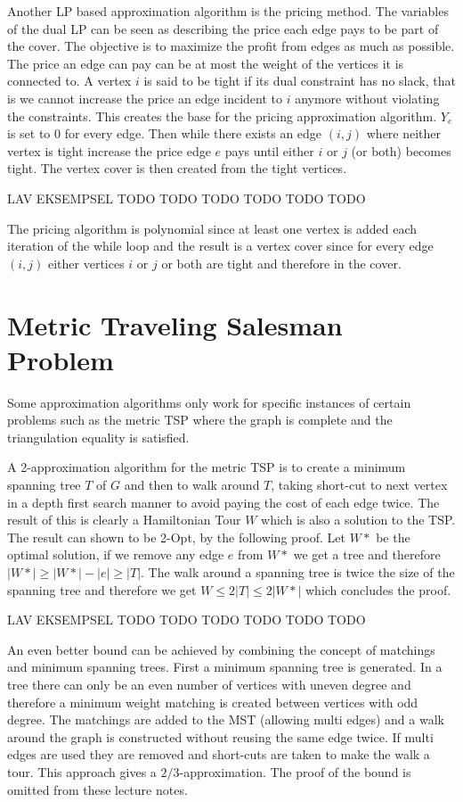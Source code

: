 Another LP based approximation algorithm is the pricing method. The variables of the dual LP can be seen as describing the price each edge pays to be part of the cover. The objective is to maximize the profit from edges as much as possible. The price an edge can pay can be at most the weight of the vertices it is connected to. A vertex $i$ is said to be tight if its dual constraint has no slack, that is we cannot increase the price an edge incident to $i$ anymore without violating the constraints. This creates the base for the pricing approximation algorithm. $Y_e$ is set to 0 for every edge. Then while there exists an edge $(i,j)$ where neither vertex is tight increase the price edge $e$ pays until either $i$ or $j$ (or both) becomes tight. The vertex cover is then created from the tight vertices.

LAV EKSEMPSEL TODO TODO TODO TODO TODO TODO

The pricing algorithm is polynomial since at least one vertex is added each iteration of the while loop and the result is a vertex cover since for every edge $(i,j)$ either vertices $i$ or $j$ or both are tight and therefore in the cover. 

\section{Metric Traveling Salesman Problem}
Some approximation algorithms only work for specific instances of certain problems such as the metric TSP where the graph is complete and the triangulation equality is satisfied. 

A 2-approximation algorithm for the metric TSP is to create a minimum spanning tree $T$ of $G$ and then to walk around $T$, taking short-cut to next vertex in a depth first search manner to avoid paying the cost of each edge twice. The result of this is clearly a Hamiltonian Tour $W$ which is also a solution to the TSP. The result can shown to be 2-Opt, by the following proof. Let $W*$ be the optimal solution, if we remove any edge $e$ from $W*$ we get a tree and therefore $|W*| \ge |W*| - |e| \ge |T|$. The walk around a spanning tree is twice the size of the spanning tree and therefore we get $W \le 2|T| \le 2|W*|$ which concludes the proof.
 
LAV EKSEMPSEL TODO TODO TODO TODO TODO TODO

An even better bound can be achieved by combining the concept of matchings and minimum spanning trees. First a minimum spanning tree is generated. In a tree there can only be an even number of vertices with uneven degree and therefore a minimum weight matching is created between vertices with odd degree. The matchings are added to the MST (allowing multi edges) and a walk around the graph is constructed without reusing the same edge twice. If multi edges are used they are removed and short-cuts are taken to make the walk a tour. This approach gives a $2/3$-approximation. The proof of the bound is omitted from these lecture notes.

